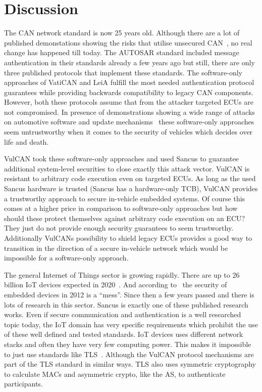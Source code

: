 
\section{Discussion}
\label{sec:discussion}

The CAN network standard is now 25 years old. Although there are a lot of
published demonstations showing the risks that utilise unsecured
CAN~\cite{Koscher2010,Hoppe2011,Checkoway2011,Cheah2017}, no real change has
happened till today. The AUTOSAR standard included message authentication in
their standards already a few years ago but still, there are only three
published protocols that implement these standards. The software-only approaches
of VatiCAN and LeiA fulfill the most needed authentication protocol guarantees
while providing backwards compatibility to legacy CAN components. However, both
these protocols assume that from the attacker targeted ECUs are not compromised.
In presence of demonstrations showing a wide range of attacks on automotive
software and update mechanisms~\cite{Checkoway2011,Koscher2010} these
software-only approaches seem untrustworthy when it comes to the security of
vehicles which decides over life and death.

VulCAN took these software-only approaches and used Sancus to guarantee
additional system-level securities to close exactly this attack vector. VulCAN
is resistant to arbitrary code execution even on targeted ECUs. As long as the
used Sancus hardware is trusted (Sancus has a hardware-only TCB), VulCAN
provides a trustworthy approach to secure in-vehicle embedded systems. Of course
this comes at a higher price in comparison to software-only approaches but how
should these protect themselves against arbitrary code execution on an ECU\@?
They just do not provide enough security guarantees to seem trustworthy.
Additionally VulCANs possibility to shield legacy ECUs provides a good way to
transition in the direction of a secure in-vehicle network which would be impossible for a software-only approach.

The general Internet of Things sector is growing rapidly. There are up to 26
billion IoT devices expected in 2020~\cite{gartner13}. And according
to~\cite{Viega2012} the security of embedded devices in 2012 is a ``mess''.
Since then a few years passed and there is lots of research in this sector.
Sancus is exactly one of these published research works. Even if secure
communication and authentication is a well researched topic today, the IoT
domain has very specific requirements which prohibit the use of these well
defined and tested standards. IoT devices uses different network stacks and
often they have very few computing power. This makes it impossible to just use
standards like TLS~\cite{TODO}. Although the VulCAN protocol mechanisms are part
of the TLS standard in similar ways. TLS also uses symmetric cryptography to
calculate MACs and asymmetric crypto, like the AS, to authenticate participants.

